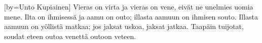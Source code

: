

[by={Unto Kupiainen}]
  \beginverse
    Vieras on virta ja vieras on vene, 
    eivät ne unelmies uomia mene. 
    Ilta on ihmisessä ja aamu on outo; 
    illasta aamuun on ihmisen souto. 
    Illasta aamuun on yöllistä matkaa; 
    jos jaksat uskoa, jaksat jatkaa. 
    Taapäin tuijotat, soudat eteen 
    outoa venettä outoon veteen. 
  \endverse
\endsong



